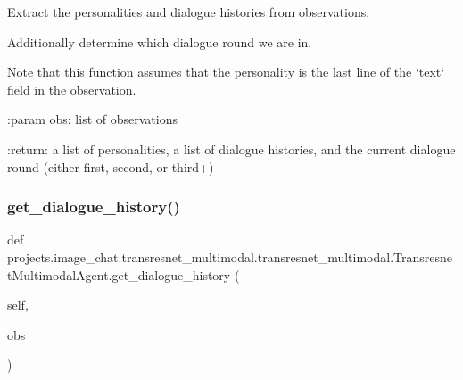 \begin{DoxyVerb}Extract the personalities and dialogue histories from observations.

Additionally determine which dialogue round we are in.

Note that this function assumes that the personality is the
last line of the `text` field in the observation.

:param obs:
    list of observations

:return:
    a list of personalities, a list of dialogue histories, and the
    current dialogue round (either first, second, or third+)
\end{DoxyVerb}
 \mbox{\label{classprojects_1_1image__chat_1_1transresnet__multimodal_1_1transresnet__multimodal_1_1TransresnetMultimodalAgent_a20dffaa1e8baf3dcaae7601946fa5724}} 
\subsubsection{\texorpdfstring{get\+\_\+dialogue\+\_\+history()}{get\_dialogue\_history()}}
{\footnotesize\ttfamily def projects.\+image\+\_\+chat.\+transresnet\+\_\+multimodal.\+transresnet\+\_\+multimodal.\+Transresnet\+Multimodal\+Agent.\+get\+\_\+dialogue\+\_\+history (\begin{DoxyParamCaption}\item[{}]{self,  }\item[{}]{obs }\end{DoxyParamCaption})}

